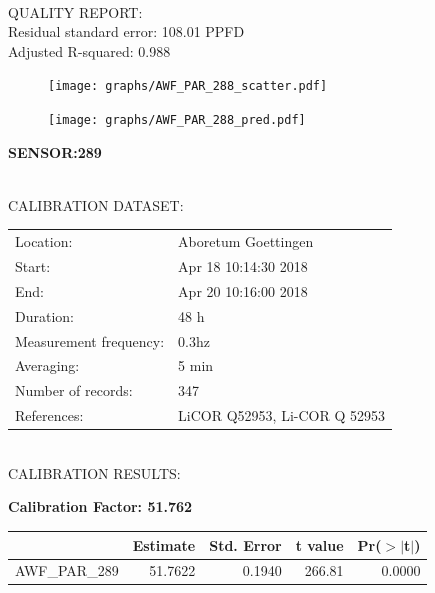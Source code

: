 \documentclass[oneside]{report}
\begin{document}
\hrulefill\\
QUALITY REPORT:\\
Residual standard error: 108.01 PPFD\\
Adjusted R-squared: 0.988



\begin{figure}[H]
  \centering
  \texttt{[image: graphs/AWF\_PAR\_288\_scatter.pdf]}
\end{figure}




\begin{figure}[H]
  \centering
  \texttt{[image: graphs/AWF\_PAR\_288\_pred.pdf]}
\end{figure}

\pagebreak


\begin{center}
\large{\textbf{SENSOR:289}}\\
\end{center}

\hrulefill\\
CALIBRATION DATASET:\\
\begin{table}[h!]
  \centering
  \label{tab:table1}
  \begin{tabular}{ll}
    Location: & Aboretum Goettingen\\ 
    
    
    Start:  & Apr 18 10:14:30 2018 \\
    End:   & Apr 20 10:16:00 2018\\ 
    Duration: & 48 h\\
    Measurement frequency: & 0.3hz\\
    Averaging:  &5 min\\
    Number of records: & 347 \\
    References: & LiCOR Q52953, Li-COR Q 52953 \\
  \end{tabular}
\end{table}

\hrulefill\\
CALIBRATION RESULTS:\\


\begin{center}
\textbf{\large{Calibration Factor: 51.762}}\\
\end{center}
\begin{table}[ht]
\centering
\begin{tabular}{rrrrr}
  \hline
 & Estimate & Std. Error & t value & Pr($>$$|$t$|$) \\ 
  \hline
AWF\_PAR\_289 & 51.7622 & 0.1940 & 266.81 & 0.0000 \\ 
   \hline
\end{tabular}
\end{table}
\end{document}
